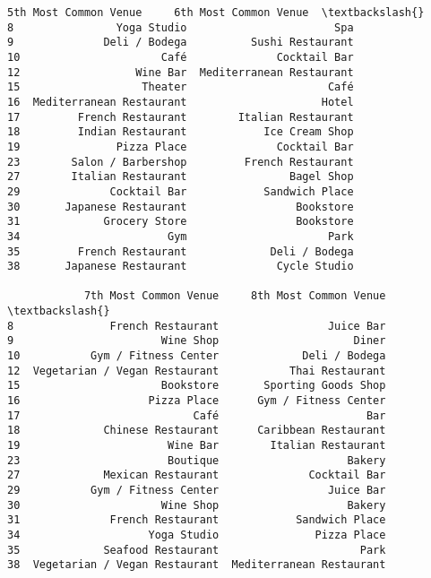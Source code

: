 \documentclass[11pt]{article}
\begin{document}
\begin{tcolorbox}[breakable, size=fbox, boxrule=.5pt, pad at break*=1mm, opacityfill=0]
\begin{Verbatim}[commandchars=\\\{\}]
       5th Most Common Venue     6th Most Common Venue  \textbackslash{}
8                Yoga Studio                       Spa
9              Deli / Bodega          Sushi Restaurant
10                      Café              Cocktail Bar
12                  Wine Bar  Mediterranean Restaurant
15                   Theater                      Café
16  Mediterranean Restaurant                     Hotel
17         French Restaurant        Italian Restaurant
18         Indian Restaurant            Ice Cream Shop
19               Pizza Place              Cocktail Bar
23        Salon / Barbershop         French Restaurant
27        Italian Restaurant                Bagel Shop
29              Cocktail Bar            Sandwich Place
30       Japanese Restaurant                 Bookstore
31             Grocery Store                 Bookstore
34                       Gym                      Park
35         French Restaurant             Deli / Bodega
38       Japanese Restaurant              Cycle Studio

            7th Most Common Venue     8th Most Common Venue  \textbackslash{}
8               French Restaurant                 Juice Bar
9                       Wine Shop                     Diner
10           Gym / Fitness Center             Deli / Bodega
12  Vegetarian / Vegan Restaurant           Thai Restaurant
15                      Bookstore       Sporting Goods Shop
16                    Pizza Place      Gym / Fitness Center
17                           Café                       Bar
18             Chinese Restaurant      Caribbean Restaurant
19                       Wine Bar        Italian Restaurant
23                       Boutique                    Bakery
27             Mexican Restaurant              Cocktail Bar
29           Gym / Fitness Center                 Juice Bar
30                      Wine Shop                    Bakery
31              French Restaurant            Sandwich Place
34                    Yoga Studio               Pizza Place
35             Seafood Restaurant                      Park
38  Vegetarian / Vegan Restaurant  Mediterranean Restaurant


\end{Verbatim}
\end{tcolorbox}
\end{document}
